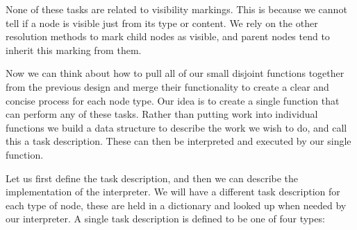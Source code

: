 \documentclass[twoside,a4paper]{report}
\begin{document}
None of these tasks are related to visibility markings. This is because we cannot tell if a node is visible just from its type or content. We rely on the
other resolution methods to mark child nodes as visible, and parent nodes tend to inherit this marking from them.

Now we can think about how to pull all of our small disjoint functions together from the previous design and merge their functionality to create a clear and
concise process for each node type. Our idea is to create a single function that can perform any of these tasks. Rather than putting work into individual
functions we build a data structure to describe the work we wish to do, and call this a task description. These can then be interpreted and executed by
our single function.

Let us first define the task description, and then we can describe the implementation of the interpreter. We will have a different task description for each
type of node, these are held in a dictionary and looked up when needed by our interpreter. A single task description is defined to be one of four types:
\end{document}
